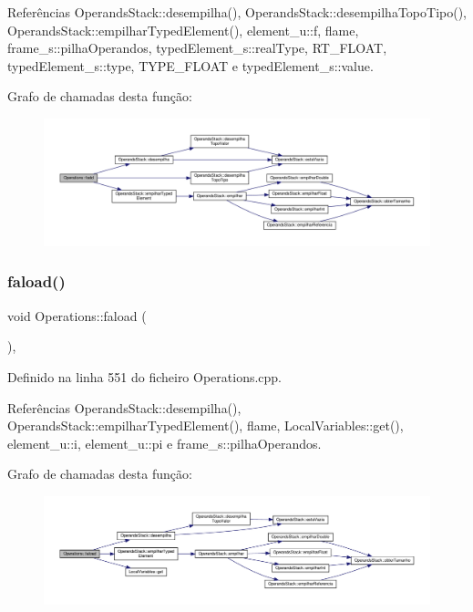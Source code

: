 Referências Operands\+Stack\+::desempilha(), Operands\+Stack\+::desempilha\+Topo\+Tipo(), Operands\+Stack\+::empilhar\+Typed\+Element(), element\+\_\+u\+::f, flame, frame\+\_\+s\+::pilha\+Operandos, typed\+Element\+\_\+s\+::real\+Type, R\+T\+\_\+\+F\+L\+O\+AT, typed\+Element\+\_\+s\+::type, T\+Y\+P\+E\+\_\+\+F\+L\+O\+AT e typed\+Element\+\_\+s\+::value.

Grafo de chamadas desta função\+:
\nopagebreak
\begin{figure}[H]
\begin{center}
\leavevmode
\includegraphics[width=350pt]{classOperations_a01a07c700f0f1574552437b76f3fdcb4_cgraph}
\end{center}
\end{figure}
\mbox{\label{classOperations_ac22c02d88fa894cafd3f53c54d91409d}} 
\subsubsection{\texorpdfstring{faload()}{faload()}}
{\footnotesize\ttfamily void Operations\+::faload (\begin{DoxyParamCaption}{ }\end{DoxyParamCaption})\hspace{0.3cm}{\ttfamily [static]}, {\ttfamily [private]}}



Definido na linha 551 do ficheiro Operations.\+cpp.



Referências Operands\+Stack\+::desempilha(), Operands\+Stack\+::empilhar\+Typed\+Element(), flame, Local\+Variables\+::get(), element\+\_\+u\+::i, element\+\_\+u\+::pi e frame\+\_\+s\+::pilha\+Operandos.

Grafo de chamadas desta função\+:
\nopagebreak
\begin{figure}[H]
\begin{center}
\leavevmode
\includegraphics[width=350pt]{classOperations_ac22c02d88fa894cafd3f53c54d91409d_cgraph}
\end{center}
\end{figure}
\mbox{\label{classOperations_aa8a2c3048379b9d5cdc2b4611ef86190}} 
